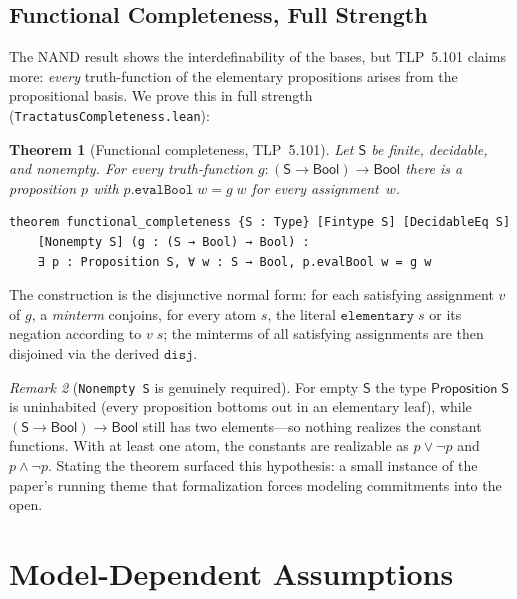 \documentclass[jsl,bibother]{asl}
\newtheorem{theorem}{Theorem}[section]
\theoremstyle{definition}
\theoremstyle{remark}
\newtheorem{remark}[theorem]{Remark}
\newcommand{\Sach}{\mathsf{S}}
\begin{document}
\subsection{Functional Completeness, Full Strength}
\label{sec:fullcompleteness}

The NAND result shows the interdefinability of the bases, but
TLP~5.101 claims more: \emph{every} truth-function of the
elementary propositions arises from the propositional basis.  We
prove this in full strength (\texttt{TractatusCompleteness.lean}):

\begin{theorem}[Functional completeness, TLP~5.101]
\label{thm:fc}
Let $\Sach$ be finite, decidable, and nonempty.  For every
truth-function $g : (\Sach \to \mathsf{Bool}) \to \mathsf{Bool}$
there is a proposition $p$ with
$p.\mathtt{evalBool}\;w = g\;w$ for every assignment~$w$.
\end{theorem}

\begin{lstlisting}
theorem functional_completeness {S : Type} [Fintype S] [DecidableEq S]
    [Nonempty S] (g : (S → Bool) → Bool) :
    ∃ p : Proposition S, ∀ w : S → Bool, p.evalBool w = g w
\end{lstlisting}

\noindent
The construction is the disjunctive normal form: for each
satisfying assignment $v$ of $g$, a \emph{minterm} conjoins, for
every atom $s$, the literal $\mathtt{elementary}\;s$ or its
negation according to $v\;s$; the minterms of all satisfying
assignments are then disjoined via the derived $\mathtt{disj}$.

\begin{remark}[\texttt{Nonempty S} is genuinely required]
\label{rem:fc-nonempty}
For empty $\Sach$ the type $\mathsf{Proposition}\;\Sach$ is
uninhabited (every proposition bottoms out in an elementary
leaf), while $(\Sach \to \mathsf{Bool}) \to \mathsf{Bool}$ still
has two elements---so nothing realizes the constant functions.
With at least one atom, the constants are realizable as
$p \lor \lnot p$ and $p \land \lnot p$.  Stating the theorem
surfaced this hypothesis: a small instance of the paper's
running theme that formalization forces modeling commitments
into the open.
\end{remark}

\section{Model-Dependent Assumptions}
\label{sec:assumptions}
\end{document}
